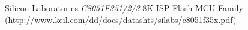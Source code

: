 \documentclass{article}
\theoremstyle{definition}
\theoremstyle{remark}
\begin{document}




\clearpage



\begin{thebibliography}{99}

 Silicon Laboratories \emph{C8051F351/2/3} 8K ISP Flash MCU Family (http://www.keil.com/dd/docs/datashts/silabs/c8051f35x.pdf)

\end{thebibliography}






\end{document}
